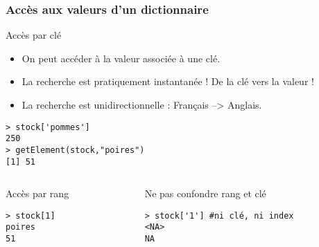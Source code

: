 \documentclass[10pt]{beamer}
\begin{document}
\begin{frame}[fragile]
  \frametitle{Accès aux valeurs d'un dictionnaire}
  \begin{alertblock}{Accès par clé}
  \begin{itemize}
  \item \alert{On peut accéder à la valeur associée à une clé.}
  \item La recherche est pratiquement instantanée ! De la clé vers la valeur !
  \item La recherche est unidirectionnelle : Français --> Anglais.
  \end{itemize}
    \begin{lstlisting}
> stock['pommes']
250
> getElement(stock,"poires")
[1] 51
\end{lstlisting}
\end{alertblock}

\begin{columns}[t]
\begin{column}{0.4\textwidth}
\begin{block}{Accès par rang}
  \begin{lstlisting}[style=block]
> stock[1]
poires
51
\end{lstlisting}
\end{block}
\end{column}
\begin{column}{0.6\textwidth}
\begin{block}{Ne pas confondre rang et clé }
  \begin{lstlisting}[style=block]
> stock['1'] #ni clé, ni index
<NA>
NA
\end{lstlisting}
\end{block}
\end{column}
\end{columns}

\end{frame}
\end{document}
